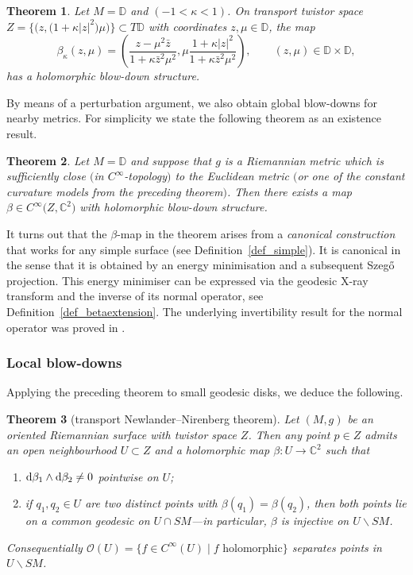 \documentclass[pdftex]{sigma}
\numberwithin{equation}{section}
\newtheorem{Theorem}{Theorem}[section]
\theoremstyle{definition}
\newcommand{\C}{\mathbb{C}} %
\newcommand{\DD}{\mathbb{D}} %
\newcommand{\1}{{\bf 1}}
\begin{document}
\begin{Theorem}\label{thm_constantcurvature}
Let $M=\DD$ and  $(-1<\kappa<1)$. On transport twistor space $Z=\big\{\bigl(z,\bigl(1+\kappa|z|^2\bigr)\mu\bigr)\big\}\subset T\DD$ with coordinates $z,\mu\in \DD$, the map
\[
			\beta_{\kappa}(z,\mu) = \left(\frac{z-\mu^2\bar z}{1+\kappa \bar z^2 \mu^2},\mu \frac{1+\kappa |z|^2}{1+\kappa \bar z^2 \mu^2}\right),\qquad (z,\mu)\in \DD\times \DD,
	\]
has a {\it holomorphic blow-down structure}.
\end{Theorem}


By means of a perturbation argument, we also obtain global blow-downs for nearby metrics. For simplicity we state the following theorem as an existence result.

\begin{Theorem}\label{thm_globalbeta}
Let $M=\DD$ and suppose that $g$ is a Riemannian metric which is sufficiently close $($in $C^\infty$-topology$)$ to the Euclidean metric $($or one of the constant curvature models from the preceding theorem$)$. Then there exists a map $\beta\in C^\infty\bigl(Z,\C^2\bigr)$ with holomorphic blow-down structure.
\end{Theorem}


It turns out that the $\beta$-map in the theorem arises from a {\it canonical construction} that works for any simple surface (see Definition~\ref{def_simple}). It is canonical in the sense that it is obtained by an energy minimisation and a subsequent Szeg\H{o} projection. This energy minimiser can be expressed via the geodesic X-ray transform and the inverse of its normal operator, see Definition~\ref{def_betaextension}. The underlying invertibility result for the normal operator was proved in \cite{MNP19a}.

\subsubsection{Local blow-downs} Applying the preceding theorem to small geodesic disks, we deduce the following.

\begin{Theorem}[transport Newlander--Nirenberg theorem]\label{TNNT} Let $(M,g)$ be an oriented Riemannian surface with twistor space $Z$. Then any point $p \in Z$ admits an open neighbourhood $U\subset Z$ and a holomorphic map $\beta\colon U\rightarrow \C^2$ such that
\begin{enumerate}[label=\rm(\roman*)]\itemsep=0pt
	\item \label{thmtnnt1}${\rm d}\beta_1\wedge {\rm d}\beta_2 \neq 0$ pointwise on $U$;
	\item\label{thmtnnt2} if $q_1,q_2\in U$ are two distinct points with $\beta(q_1)=\beta(q_2)$, then both points lie on a common geodesic on $U\cap SM$---in particular, $\beta$ is injective on $U\backslash SM$.
\end{enumerate}
Consequentially $\mathcal O(U)=\{f\in C^\infty(U)\mid f \text{ holomorphic} \}$ separates points in $U\backslash SM$.
\end{Theorem}
\end{document}
